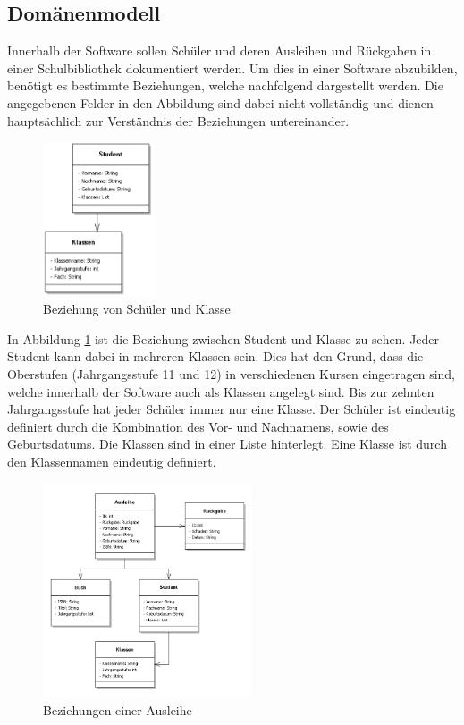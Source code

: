 \subsection{Domänenmodell}\label{sec:domaenen}
Innerhalb der Software sollen Schüler und deren Ausleihen und Rückgaben in einer Schulbibliothek dokumentiert werden. Um dies in einer Software abzubilden, benötigt es bestimmte Beziehungen, welche nachfolgend dargestellt werden. Die angegebenen Felder in den Abbildung sind dabei nicht vollständig und dienen hauptsächlich zur Verständnis der Beziehungen untereinander.
\begin{figure}[H]
	\centering
	\includegraphics[width=0.30\textwidth]{figures/konzept/studclass.PNG}
	\caption{Beziehung von Schüler und Klasse}
	\label{fig:studclass}
\end{figure}
In Abbildung \ref{fig:studclass} ist die Beziehung zwischen Student und Klasse zu sehen. Jeder Student kann dabei in mehreren Klassen sein. Dies hat den Grund, dass die Oberstufen (Jahrgangsstufe 11 und 12) in verschiedenen Kursen eingetragen sind, welche innerhalb der Software auch als Klassen angelegt sind. Bis zur zehnten Jahrgangsstufe hat jeder Schüler immer nur eine Klasse. Der Schüler ist eindeutig definiert durch die Kombination des Vor- und Nachnamens, sowie des Geburtsdatums. Die Klassen sind in einer Liste hinterlegt. Eine Klasse ist durch den Klassennamen eindeutig definiert. 
\begin{figure}[H]
	\centering
	\includegraphics[width=0.55\textwidth]{figures/konzept/rueckgabe.PNG}
	\caption{Beziehungen einer Ausleihe}
	\label{fig:ausleihe}
\end{figure}
